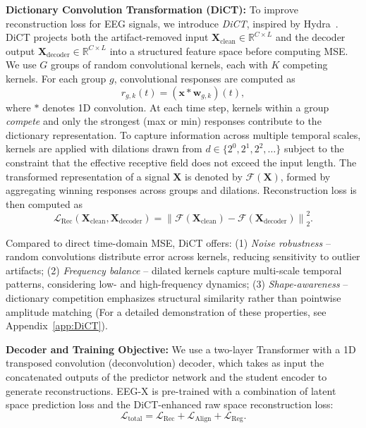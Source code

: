 \documentclass{article} %
\begin{document}
\textbf{Dictionary Convolution Transformation (DiCT):} To improve reconstruction loss for EEG signals, we introduce \textit{DiCT}, inspired by Hydra~\citep{Hydra}. 
DiCT projects both the artifact-removed input $\mathbf{X}_{\text{clean}} \in \mathbb{R}^{C \times L}$ 
and the decoder output $\mathbf{X}_{\text{decoder}} \in \mathbb{R}^{C \times L}$ into a structured feature space before computing MSE. 
We use $G$ groups of random convolutional kernels, each with $K$ competing kernels. 
For each group $g$, convolutional responses are computed as
\begin{equation}
r_{g,k}(t) = (\mathbf{x} * \mathbf{w}_{g,k})(t),
\end{equation}
where $*$ denotes 1D convolution. At each time step, kernels within a group \textit{compete} 
and only the strongest (max or min) responses contribute to the dictionary representation. 
To capture information across multiple temporal scales, kernels are applied with dilations drawn from $d \in \{2^0, 2^1, 2^2, \dots\}$ subject to the constraint that the effective receptive field does not exceed the input length.
The transformed representation of a signal $\mathbf{X}$ is denoted by $\mathcal{F}(\mathbf{X})$, 
formed by aggregating winning responses across groups and dilations. 
Reconstruction loss is then computed as 
\begin{equation}
\mathcal{L}_{\text{Rec}}(\mathbf{X}_{\text{clean}}, \mathbf{X}_{\text{decoder}}) 
= \left\| \mathcal{F}(\mathbf{X}_{\text{clean}}) - \mathcal{F}(\mathbf{X}_{\text{decoder}}) \right\|_2^2 .
\end{equation}

Compared to direct time-domain MSE, DiCT offers: 
(1) \textit{Noise robustness} – random convolutions distribute error across kernels, reducing sensitivity to outlier artifacts; 
(2) \textit{Frequency balance} – dilated kernels capture multi-scale temporal patterns, considering low- and high-frequency dynamics; 
(3) \textit{Shape-awareness} – dictionary competition emphasizes structural similarity rather than pointwise amplitude matching (For a detailed demonstration of these properties, see Appendix~\ref{app:DiCT}).

\textbf{Decoder and Training Objective:}  
We use a two-layer Transformer with a 1D transposed convolution (deconvolution) decoder, which takes as input the concatenated outputs of the predictor network and the student encoder to generate reconstructions.
EEG-X is pre-trained with a combination of latent space prediction loss and the DiCT-enhanced raw space reconstruction loss:
\begin{equation}
   \mathcal{L}_{\text{total}} 
   = \mathcal{L}_{\text{Rec}} + \mathcal{L}_{\text{Align}} + \mathcal{L}_{\text{Reg}} .
\end{equation}
\end{document}
